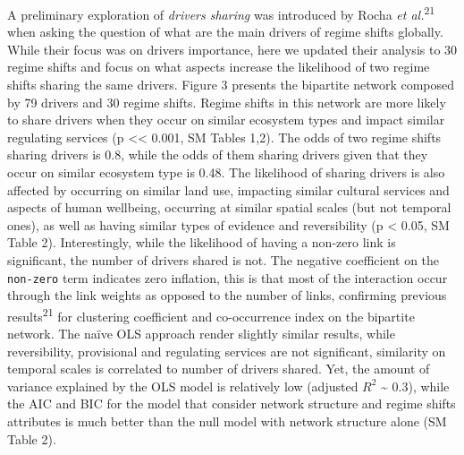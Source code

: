 \documentclass[9pt,]{article}
\begin{document}
A preliminary exploration of \emph{drivers sharing} was introduced by
Rocha \emph{et al.}\textsuperscript{21} when asking the question of what
are the main drivers of regime shifts globally. While their focus was on
drivers importance, here we updated their analysis to 30 regime shifts
and focus on what aspects increase the likelihood of two regime shifts
sharing the same drivers. Figure 3 presents the bipartite network
composed by 79 drivers and 30 regime shifts. Regime shifts in this
network are more likely to share drivers when they occur on similar
ecosystem types and impact similar regulating services (p
\textless{}\textless{} 0.001, SM Tables 1,2). The odds of two regime
shifts sharing drivers is 0.8, while the odds of them sharing drivers
given that they occur on similar ecosystem type is 0.48. The likelihood
of sharing drivers is also affected by occurring on similar land use,
impacting similar cultural services and aspects of human wellbeing,
occurring at similar spatial scales (but not temporal ones), as well as
having similar types of evidence and reversibility (p \textless{} 0.05,
SM Table 2). Interestingly, while the likelihood of having a non-zero
link is significant, the number of drivers shared is not. The negative
coefficient on the \texttt{non-zero} term indicates zero inflation, this
is that most of the interaction occur through the link weights as
opposed to the number of links, confirming previous
results\textsuperscript{21} for clustering coefficient and co-occurrence
index on the bipartite network. The naïve OLS approach render slightly
similar results, while reversibility, provisional and regulating
services are not significant, similarity on temporal scales is
correlated to number of drivers shared. Yet, the amount of variance
explained by the OLS model is relatively low (adjusted \(R^2\)
\textasciitilde{} 0.3), while the AIC and BIC for the model that
consider network structure and regime shifts attributes is much better
than the null model with network structure alone (SM Table 2).
\end{document}
